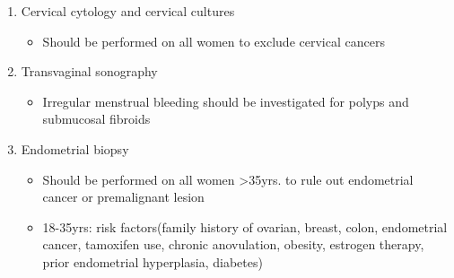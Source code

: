 {\begin{itemize}
\begin{enumerate}
\begin{itemize}
		\item  FSH/LH: verify menopausal status or rule out PCOS  
		\end{itemize}
	\item  Cervical cytology and cervical cultures 
		\begin{itemize}\tightlist
		\item  Should be performed on all women to exclude cervical cancers  
		\end{itemize}
	\item  Transvaginal sonography  
		\begin{itemize}\tightlist
		\item  Irregular menstrual bleeding should be investigated for polyps and submucosal fibroids  
		\end{itemize}
	\item   Endometrial biopsy 
		\begin{itemize}\tightlist
		\item  Should be performed on all women >35yrs. to rule out endometrial cancer or premalignant lesion  
		\item  18-35yrs: risk factors(family history of ovarian, breast, colon, endometrial cancer, tamoxifen use, chronic anovulation, obesity, estrogen therapy, prior endometrial hyperplasia, diabetes)  
		\end{itemize}
	\end{enumerate}
\end{itemize}
}